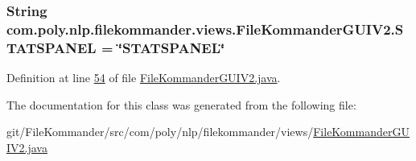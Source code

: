 \hypertarget{classcom_1_1poly_1_1nlp_1_1filekommander_1_1views_1_1_file_kommander_g_u_i_v2_aff9a87dc378944cb3ab200905c962ef8}{
\subsubsection[{S\-T\-A\-T\-S\-P\-A\-N\-E\-L}]{\setlength{\rightskip}{0pt plus 5cm}String com.\-poly.\-nlp.\-filekommander.\-views.\-File\-Kommander\-G\-U\-I\-V2.\-S\-T\-A\-T\-S\-P\-A\-N\-E\-L = \char`\"{}S\-T\-A\-T\-S\-P\-A\-N\-E\-L\char`\"{}\hspace{0.3cm}{\ttfamily [private]}}}\label{classcom_1_1poly_1_1nlp_1_1filekommander_1_1views_1_1_file_kommander_g_u_i_v2_aff9a87dc378944cb3ab200905c962ef8}


Definition at line \hyperlink{L54}{54} of file \hyperlink{}{File\-Kommander\-G\-U\-I\-V2.\-java}.



The documentation for this class was generated from the following file\-:\begin{DoxyCompactItemize}
\item 
git/\-File\-Kommander/src/com/poly/nlp/filekommander/views/\hyperlink{_file_kommander_g_u_i_v2_8java}{File\-Kommander\-G\-U\-I\-V2.\-java}\end{DoxyCompactItemize}
